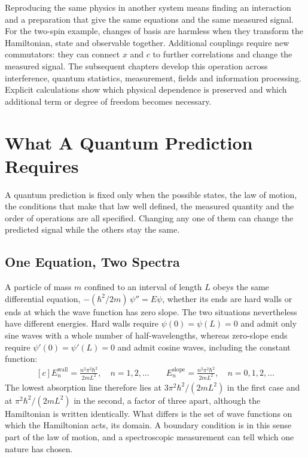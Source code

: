 \documentclass[11pt,oneside]{book}
\newenvironment{centeredalign}{\[\begin{gathered}[c]}{\end{gathered}\]}
\begin{document}
Reproducing the same physics in another system means finding an interaction
and a preparation that give the same equations and the same measured signal.
For the two-spin example, changes of basis are harmless when they transform
the Hamiltonian, state and observable together. Additional couplings require
new commutators: they can connect \(x\) and \(c\) to further correlations and
change the measured signal. The subsequent chapters develop this operation
across interference, quantum statistics, measurement, fields and information
processing. Explicit calculations show which physical dependence is preserved
and which additional term or degree of freedom becomes necessary.



\chapter{What A Quantum Prediction Requires}\label{chap:physical-identity}
\begin{claimbox}
A quantum prediction is fixed only when the possible states, the law of motion, the conditions that make that law
well defined, the measured quantity and the order of operations are all specified. Changing any one of them can change
the predicted signal while the others stay the same.
\end{claimbox}

\section{One Equation, Two Spectra}
A particle of mass \(m\) confined to an interval of length \(L\) obeys the same differential equation,
\(-(\hbar^2/2m)\,\psi''=E\psi\), whether its ends are hard walls or ends at which the wave function has zero slope.
The two situations nevertheless have different energies. Hard walls require \(\psi(0)=\psi(L)=0\) and admit only sine
waves with a whole number of half-wavelengths, whereas zero-slope ends require \(\psi'(0)=\psi'(L)=0\) and admit cosine
waves, including the constant function:
\begin{centeredalign}
E_n^{\mathrm{wall}}=\frac{n^2\pi^2\hbar^2}{2mL^2},\quad n=1,2,\ldots\qquad
E_n^{\mathrm{slope}}=\frac{n^2\pi^2\hbar^2}{2mL^2},\quad n=0,1,2,\ldots
\end{centeredalign}
The lowest absorption line therefore lies at \(3\pi^2\hbar^2/(2mL^2)\) in the first case and at
\(\pi^2\hbar^2/(2mL^2)\) in the second, a factor of three apart, although the Hamiltonian is written identically. What
differs is the set of wave functions on which the Hamiltonian acts, its domain. A boundary condition is in this sense
part of the law of motion, and a spectroscopic measurement can tell which one nature has chosen.
\end{document}

